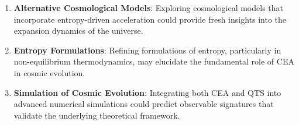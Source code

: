 \begin{enumerate}
\item \textbf{Alternative Cosmological Models}: Exploring cosmological models that incorporate entropy-driven acceleration could provide fresh insights into the expansion dynamics of the universe.

\item \textbf{Entropy Formulations}: Refining formulations of entropy, particularly in non-equilibrium thermodynamics, may elucidate the fundamental role of CEA in cosmic evolution.

\item \textbf{Simulation of Cosmic Evolution}: Integrating both CEA and QTS into advanced numerical simulations could predict observable signatures that validate the underlying theoretical framework.
\end{enumerate}
